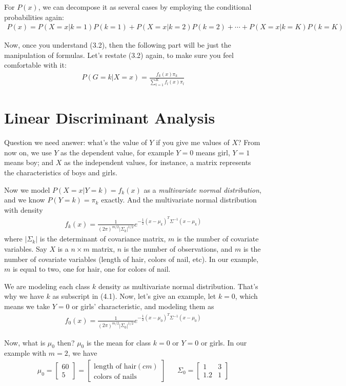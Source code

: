 \documentclass[12pt]{article}
\theoremstyle{definition}
\numberwithin{equation}{section}
\numberwithin{figure}{section}
\numberwithin{table}{section}
\begin{document}
For $P(x)$, we can decompose it as several cases by employing the conditional probabilities again: 
\begin{align*}
	P(x) = P(X = x|k =1) P(k=1) + P(X = x |k=2) P(k=2) + \cdots + P(X= x|k=K) P(k=K)
\end{align*}


Now, once you understand (3.2), then the following part will be just the manipulation of formulas. Let's restate (3.2) again, to make sure you feel comfortable with it:
\begin{align*}
  P(G = k | X = x) = \frac{f_k(x) \pi_k}{\sum_{l = 1}^K f_l(x) \pi_l}
\end{align*}


\section{Linear Discriminant Analysis}

Question we need answer: what's the value of $Y$ if you give me values of $X$? From now on, we use $Y$ as the dependent value, for example $Y = 0$ means girl, $Y=1$ means boy; and $X$ as the independent values, for instance, a matrix represents the characteristics of boys and girls. 

Now we model $P(X = x | Y = k) = f_k(x)$ as a \textit{multivariate normal distribution}, and we know $P(Y = k) = \pi_k$ exactly. And the multivariate normal distribution with density
\begin{align}
	f_k(x) = \frac{1}{(2\pi)^{m/2}|\Sigma_k|^{1/2}}	e^{-\frac{1}{2} (x - \mu_k)^T \Sigma^{-1}(x - \mu_k) }
\end{align}
where $|\Sigma_k|$ is the determinant of covariance matrix, $m$ is the number of covariate variables. Say $X$ is a $n \times m$ matrix, $n$ is the number of observations, and $m$ is the number of covariate variables (length of hair, colors of nail, etc). In our example, $m$ is equal to two, one for hair, one for colors of nail. 

We are modeling each class $k$ density as multivariate normal distribution. That's why we have $k$ as subscript in (4.1). Now, let's give an example, let $k=0$, which means we take $Y =0$ or girls' characteristic, and modeling them as
\begin{align*}
	f_0(x) = \frac{1}{(2\pi)^{m/2}|\Sigma_0|^{1/2}}	e^{-\frac{1}{2} (x - \mu_0)^T \Sigma^{-1}(x - \mu_0) }
\end{align*}

Now, what is $\mu_0$ then? $\mu_0$ is the mean for class $k=0$ or $Y=0$ or girls. In our example with $m=2$, we have 
\begin{align*}
	\mu_0 = \begin{bmatrix}
		60 \\
		5
	\end{bmatrix} = \begin{bmatrix}
		\text{length of hair}(cm)\\
		\text{colors of nails}
	\end{bmatrix} & & \Sigma_0 = \begin{bmatrix}
		1 & 3 \\
		1.2 & 1
	\end{bmatrix}
\end{align*}
\end{document}
